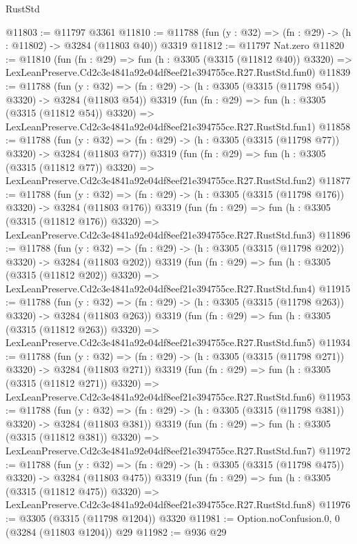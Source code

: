 \begin{lexlean}{RustStd}
\begin{coremodule}
@11803 := @11797 @3361
@11810 := @11788 (fun (y : @32) => (fn : @29) -> (h : @11802) -> @3284 (@11803 @40)) @3319
@11812 := @11797 Nat.zero
@11820 := @11810
    (fun (fn : @29) =>
    fun (h : @3305 (@3315 (@11812 @40)) @3320) =>
    LexLeanPreserve.Cd2c3e4841a92e04df8eef21e394755ce.R27.RustStd.fun0)
@11839 := @11788
    (fun (y : @32) => (fn : @29) -> (h : @3305 (@3315 (@11798 @54)) @3320) -> @3284 (@11803 @54))
    @3319
    (fun (fn : @29) =>
    fun (h : @3305 (@3315 (@11812 @54)) @3320) =>
    LexLeanPreserve.Cd2c3e4841a92e04df8eef21e394755ce.R27.RustStd.fun1)
@11858 := @11788
    (fun (y : @32) => (fn : @29) -> (h : @3305 (@3315 (@11798 @77)) @3320) -> @3284 (@11803 @77))
    @3319
    (fun (fn : @29) =>
    fun (h : @3305 (@3315 (@11812 @77)) @3320) =>
    LexLeanPreserve.Cd2c3e4841a92e04df8eef21e394755ce.R27.RustStd.fun2)
@11877 := @11788
    (fun (y : @32) => (fn : @29) -> (h : @3305 (@3315 (@11798 @176)) @3320) -> @3284 (@11803 @176))
    @3319
    (fun (fn : @29) =>
    fun (h : @3305 (@3315 (@11812 @176)) @3320) =>
    LexLeanPreserve.Cd2c3e4841a92e04df8eef21e394755ce.R27.RustStd.fun3)
@11896 := @11788
    (fun (y : @32) => (fn : @29) -> (h : @3305 (@3315 (@11798 @202)) @3320) -> @3284 (@11803 @202))
    @3319
    (fun (fn : @29) =>
    fun (h : @3305 (@3315 (@11812 @202)) @3320) =>
    LexLeanPreserve.Cd2c3e4841a92e04df8eef21e394755ce.R27.RustStd.fun4)
@11915 := @11788
    (fun (y : @32) => (fn : @29) -> (h : @3305 (@3315 (@11798 @263)) @3320) -> @3284 (@11803 @263))
    @3319
    (fun (fn : @29) =>
    fun (h : @3305 (@3315 (@11812 @263)) @3320) =>
    LexLeanPreserve.Cd2c3e4841a92e04df8eef21e394755ce.R27.RustStd.fun5)
@11934 := @11788
    (fun (y : @32) => (fn : @29) -> (h : @3305 (@3315 (@11798 @271)) @3320) -> @3284 (@11803 @271))
    @3319
    (fun (fn : @29) =>
    fun (h : @3305 (@3315 (@11812 @271)) @3320) =>
    LexLeanPreserve.Cd2c3e4841a92e04df8eef21e394755ce.R27.RustStd.fun6)
@11953 := @11788
    (fun (y : @32) => (fn : @29) -> (h : @3305 (@3315 (@11798 @381)) @3320) -> @3284 (@11803 @381))
    @3319
    (fun (fn : @29) =>
    fun (h : @3305 (@3315 (@11812 @381)) @3320) =>
    LexLeanPreserve.Cd2c3e4841a92e04df8eef21e394755ce.R27.RustStd.fun7)
@11972 := @11788
    (fun (y : @32) => (fn : @29) -> (h : @3305 (@3315 (@11798 @475)) @3320) -> @3284 (@11803 @475))
    @3319
    (fun (fn : @29) =>
    fun (h : @3305 (@3315 (@11812 @475)) @3320) =>
    LexLeanPreserve.Cd2c3e4841a92e04df8eef21e394755ce.R27.RustStd.fun8)
@11976 := @3305 (@3315 (@11798 @1204)) @3320
@11981 := Option.noConfusion.{0, 0} (@3284 (@11803 @1204)) @29
@11982 := @936 @29

\end{coremodule}
\end{lexlean}
